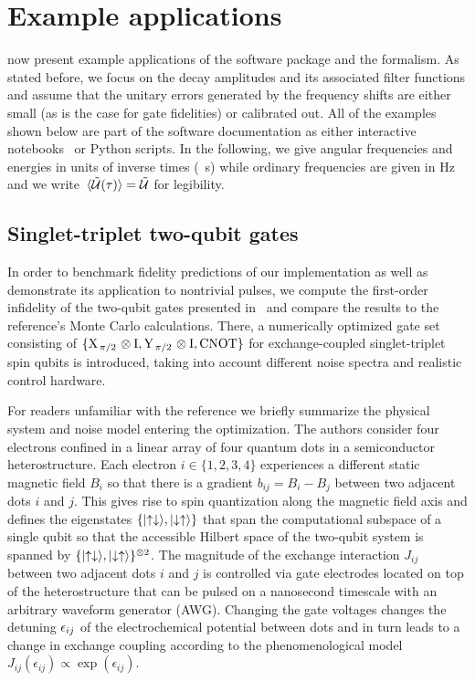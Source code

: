 \chapter{Example applications}\label{ch:ff:examples}
 now present example applications of the software package and the formalism.
As stated before, we focus on the decay amplitudes \decayamps and its associated filter functions and assume that the unitary errors generated by the frequency shifts \freqshifts are either small (as is the case for gate fidelities) or calibrated out.
All of the examples shown below are part of the software documentation as either interactive \jupyter notebooks~\cite{Kluyver2016} or Python scripts.
In the following, we give angular frequencies and energies in units of inverse times (\eg \si{\per\second}) while ordinary frequencies are given in \si{\hertz} and we write $\liouvUetavg = \liouvUe$ for legibility.

\section{Singlet-triplet two-qubit gates}\label{sec:ff:examples:optimized_gates}
In order to benchmark fidelity predictions of our implementation as well as demonstrate its application to nontrivial pulses, we compute the first-order infidelity of the two-qubit gates presented in~ and compare the results to the reference's Monte Carlo calculations.
There, a numerically optimized gate set consisting of $\lbrace\XID2,\YID2,\CNOT\rbrace$ for exchange-coupled singlet-triplet spin qubits is introduced, taking into account different noise spectra and realistic control hardware.

For readers unfamiliar with the reference we briefly summarize the physical system and noise model entering the optimization.
The authors consider four electrons confined in a linear array of four quantum dots in a semiconductor heterostructure.
Each electron $i\in\lbrace 1,2,3,4\rbrace$ experiences a different static magnetic field $B_i$ so that there is a gradient $b_{ij} = B_i - B_j$ between two adjacent dots $i$ and $j$.
This gives rise to spin quantization along the magnetic field axis and defines the eigenstates $\lbrace\mbox{\ensuremath{\ket{\uparrow\downarrow}}},\mbox{\ensuremath{\ket{\downarrow\uparrow}}}\rbrace$ that span the computational subspace of a single qubit so that the accessible Hilbert space of the two-qubit system is spanned by $\lbrace\mbox{\ensuremath{\ket{\uparrow\downarrow}}},\mbox{\ensuremath{\ket{\downarrow\uparrow}}}\rbrace^{\otimes 2}$.
The magnitude of the exchange interaction $J_{ij}$ between two adjacent dots $i$ and $j$ is controlled via gate electrodes located on top of the heterostructure that can be pulsed on a nanosecond timescale with an arbitrary waveform generator (AWG).
Changing the gate voltages changes the detuning $\epsilon_{ij}$ of the electrochemical potential between dots and in turn leads to a change in exchange coupling according to the phenomenological model $J_{ij}(\epsilon_{ij})\propto\exp(\epsilon_{ij})$.

